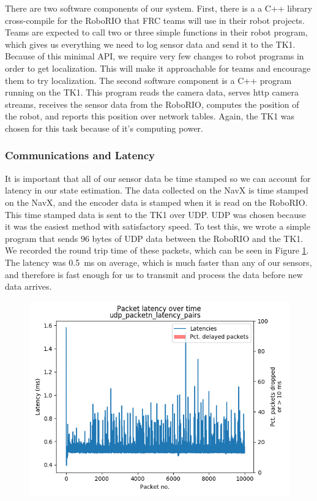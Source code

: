 \documentclass{article}
\begin{document}
    There are two software components of our system. First, there is a a C++ library cross-compile for the RoboRIO that FRC teams will use in their robot projects. Teams are expected to call two or three simple functions in their robot program, which gives us everything we need to log sensor data and send it to the TK1. Because of this minimal API, we require very few changes to robot programs in order to get localization. This will make it approachable for teams and encourage them to try localization. The second software component is a C++ program running on the TK1. This program reads the camera data, serves http camera streams, receives the sensor data from the RoboRIO, computes the position of the robot, and reports this position over network tables. Again, the TK1 was chosen for this task because of it's computing power.

    \subsubsection{Communications and Latency}

    It is important that all of our sensor data be time stamped so we can account for latency in our state estimation. The data collected on the NavX is time stamped on the NavX, and the encoder data is stamped when it is read on the RoboRIO. This time stamped data is sent to the TK1 over UDP. UDP was chosen because it was the easiest method with satisfactory speed. To test this, we wrote a simple program that sends 96 bytes of UDP data between the RoboRIO and the TK1. We recorded the round trip time of these packets, which can be seen in Figure \ref{fig:udp_timing}. The latency was \SI{0.5}{\milli\second} on average, which is much faster than any of our sensors, and therefore is fast enough for us to transmit and process the data before new data arrives.

      \begin{figure}[H]
        \centering
        \includegraphics[width=0.7\linewidth]{./images/rio_tk1_udp_latency_timeseries.png}
        \label{fig:udp_timing}
        \caption{}
      \end{figure}
\end{document}
